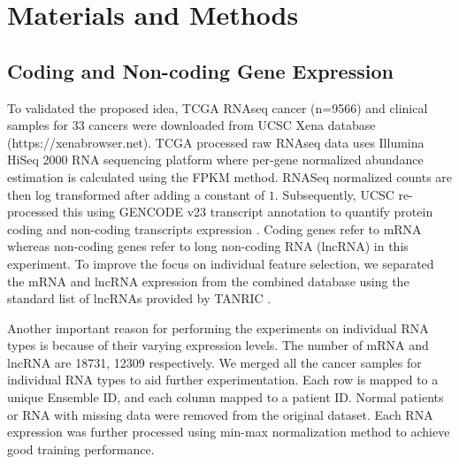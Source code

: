 \documentclass{bioinfo}
\begin{document}
\section{Materials and Methods}
\subsection{Coding and Non-coding Gene Expression}
To validated the proposed idea, TCGA RNAseq cancer (n=9566) and clinical samples for $33$ cancers were downloaded from UCSC Xena database (https://xenabrowser.net). 
TCGA processed raw RNAseq data uses Illumina HiSeq 2000 RNA sequencing platform where per-gene normalized abundance estimation is calculated using the FPKM method. 
RNASeq normalized counts are then log transformed after adding a constant of $1$. 
Subsequently, UCSC re-processed this using GENCODE v23 transcript annotation to quantify protein coding and non-coding transcripts expression \citep{harrow2006gencode}. 
Coding genes refer to mRNA whereas non-coding genes refer to long non-coding RNA (lncRNA) in this experiment. 
To improve the focus on individual feature selection, we separated the mRNA and lncRNA expression from the combined database using the standard list of lncRNAs provided by TANRIC \citep{li2015tanric}. 

Another important reason for performing the experiments on individual RNA types is because of their varying expression levels.  The number of mRNA and lncRNA are 18731, 12309 respectively. 
We merged all the cancer samples for individual RNA types to aid further experimentation. 
Each row is mapped to a unique Ensemble ID, and each column mapped to a patient ID. 
Normal patients or RNA with missing data were removed from the original dataset. 
Each RNA expression was further processed using min-max normalization method to achieve good training performance. 
\end{document}
